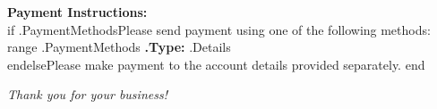 \documentclass[12pt]{article}
\begin{document}
\vspace{1cm}

\textbf{Payment Instructions:} \\
{{if .PaymentMethods}}Please send payment using one of the following methods:\\
{{range .PaymentMethods}}\textbf{ {{.Type}}: } {{.Details}}\\
{{end}}{{else}}Please make payment to the account details provided separately.
{{end}}

\vfill

\centering
{\itshape Thank you for your business!}
\end{document}
